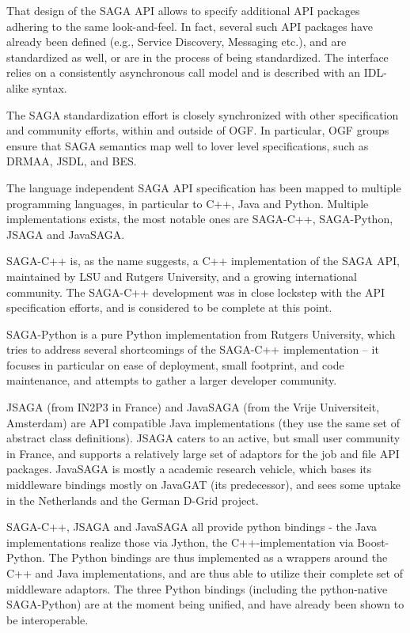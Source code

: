 \documentclass[twocolumn]{svjour3}       %
\begin{document}
That design of the SAGA API allows to specify additional API packages adhering to the same look-and-feel.  In fact, several such API packages have already been defined (e.g., Service Discovery, Messaging etc.), and are standardized as well, or are in the process of being standardized. The interface relies on a consistently asynchronous call model and is described with an IDL-alike syntax.

The SAGA standardization effort is closely synchronized with other specification and community efforts, within and outside of OGF.  In particular, OGF groups ensure that SAGA semantics map well to lover level specifications, such as DRMAA, JSDL, and BES.

The language independent SAGA API specification has been mapped to multiple programming languages, in particular to C++, Java and Python.  Multiple implementations exists, the most notable ones are SAGA-C++, SAGA-Python, JSAGA and JavaSAGA.

SAGA-C++ is, as the name suggests, a C++ implementation of the SAGA API, maintained by LSU and Rutgers University, and a growing international community.  The SAGA-C++ development was in close lockstep with the API specification efforts, and is considered to be complete at this point.

SAGA-Python is a pure Python implementation from Rutgers University, which tries to address several shortcomings of the SAGA-C++ implementation -- it focuses in particular on ease of deployment, small footprint, and code maintenance, and attempts to gather a larger developer community.
  
JSAGA (from IN2P3 in France) and JavaSAGA (from the Vrije Universiteit, Amsterdam) are API compatible Java implementations (they use the same set of abstract class definitions).  JSAGA caters to an active, but small user community in France, and supports a relatively large set of adaptors for the job and file API packages.  JavaSAGA is mostly a academic research vehicle, which bases its middleware bindings mostly on JavaGAT (its predecessor), and sees some uptake in the Netherlands and the German D-Grid project.

SAGA-C++, JSAGA and JavaSAGA all provide python bindings - the Java implementations realize those via Jython, the C++-implementation via Boost-Python.    The Python bindings are thus implemented as a wrappers around the C++ and Java implementations, and are thus able to utilize their complete set of middleware adaptors. The three Python bindings (including the python-native SAGA-Python) are at the moment being unified, and have already been shown to be interoperable.
\end{document}
